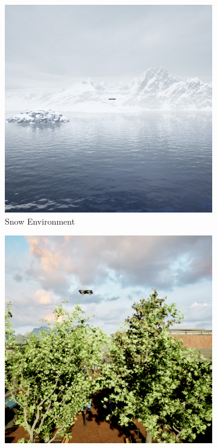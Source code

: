 \documentclass[twoside]{ctuthesis}
\theoremstyle{plain}
\theoremstyle{definition}
\theoremstyle{note}
\begin{document}
\begin{figure}
	\centering
	\begin{subfigure}[b]{0.3\textwidth}
		\centering
		\includegraphics[width=\textwidth]{snow_rgb.png}
		\caption{Snow Environment}
	\end{subfigure}
	\hfill
	\begin{subfigure}[b]{0.3\textwidth}
		\centering
		\includegraphics[width=\textwidth]{city_rgb.png}

\end{subfigure}
\end{figure}
\end{document}
